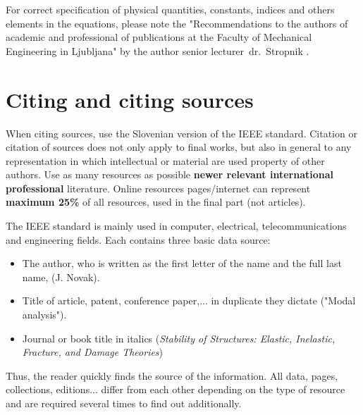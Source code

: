 For correct specification of physical quantities, constants, indices and others
elements in the equations, please note the "Recommendations to the authors of academic and professional
of publications at the Faculty of Mechanical Engineering in Ljubljana" by the author
senior lecturer~dr.~Stropnik \cite{stropnik_1997}.

\section{Citing and citing sources}\label{sec:citing}

When citing sources, use the Slovenian version of the IEEE standard. Citation
or citation of sources does not only apply to final works, but also in general to
any representation in which intellectual or material are used
property of other authors. Use as many resources as possible
\textbf{newer relevant international professional} literature. Online resources
pages/internet can represent \textbf{maximum 25\%} of all resources,
used in the final part (not articles).

The IEEE standard is mainly used in computer, electrical,
telecommunications and engineering fields. Each contains three basic data
source:
\begin{itemize}
\item The author, who is written as the first letter of the name and the full last name, (J.
Novak).
\item Title of article, patent, conference paper,... in duplicate
they dictate ("Modal analysis").
\item Journal or book title in italics (\emph{Stability of
Structures: Elastic, Inelastic, Fracture, and Damage Theories})
\end{itemize}
Thus, the reader quickly finds the source of the information. All data, pages, collections,
editions... differ from each other depending on the type of resource and are required
several times to find out additionally.


